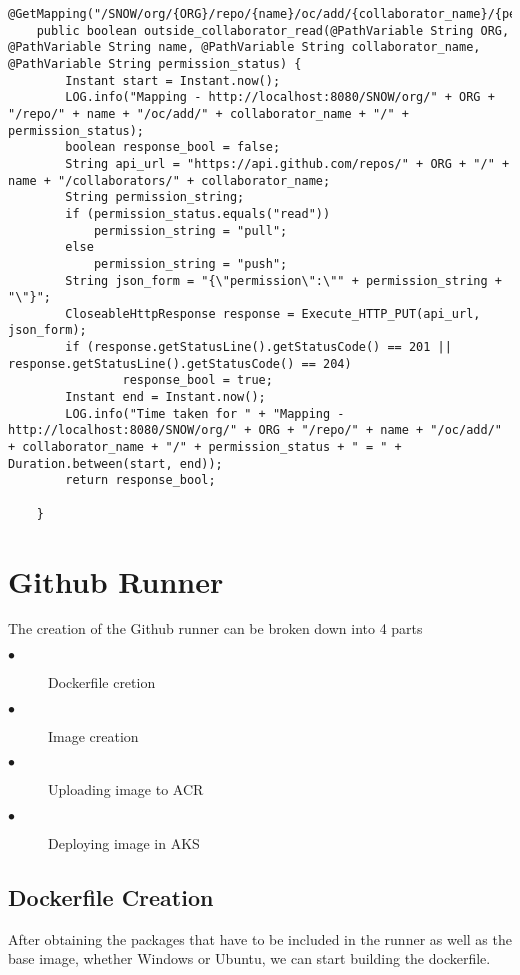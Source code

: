 \begin{lstlisting}[breaklines]
 @GetMapping("/SNOW/org/{ORG}/repo/{name}/oc/add/{collaborator_name}/{permission_status}")
    public boolean outside_collaborator_read(@PathVariable String ORG, @PathVariable String name, @PathVariable String collaborator_name, @PathVariable String permission_status) {
        Instant start = Instant.now();
        LOG.info("Mapping - http://localhost:8080/SNOW/org/" + ORG + "/repo/" + name + "/oc/add/" + collaborator_name + "/" + permission_status);
        boolean response_bool = false;
        String api_url = "https://api.github.com/repos/" + ORG + "/" + name + "/collaborators/" + collaborator_name;
        String permission_string;
        if (permission_status.equals("read"))
            permission_string = "pull";
        else 
            permission_string = "push";
        String json_form = "{\"permission\":\"" + permission_string + "\"}";
        CloseableHttpResponse response = Execute_HTTP_PUT(api_url, json_form);
        if (response.getStatusLine().getStatusCode() == 201 || response.getStatusLine().getStatusCode() == 204)
                response_bool = true;
        Instant end = Instant.now();
        LOG.info("Time taken for " + "Mapping - http://localhost:8080/SNOW/org/" + ORG + "/repo/" + name + "/oc/add/" + collaborator_name + "/" + permission_status + " = " + Duration.between(start, end));
        return response_bool;
        
    }
\end{lstlisting}
\section{Github Runner}
The creation of the Github runner can be broken down into 4 parts
\begin{description}

\item[$\bullet$] Dockerfile cretion

\item[$\bullet$] Image creation

\item[$\bullet$] Uploading image to ACR

\item[$\bullet$] Deploying image in AKS

\end{description}

\subsection{Dockerfile Creation}
After obtaining the packages that have to be included in the runner as well as the base image, whether Windows or Ubuntu, we can start building the dockerfile.

